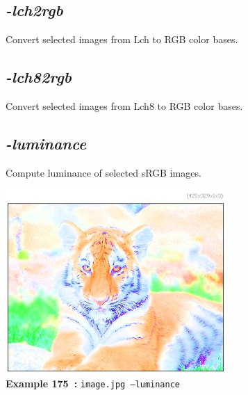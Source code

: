 \documentclass[a4paper,11pt,twoside]{book}
\begin{document}
\subsection{\emph{-lch2rgb} }\vspace*{-0.5em}
Convert selected images from Lch to RGB color bases.


\subsection{\emph{-lch82rgb} }\vspace*{-0.5em}
Convert selected images from Lch8 to RGB color bases.


\subsection{\emph{-luminance} }\vspace*{-0.5em}
Compute luminance of selected sRGB images.
\begin{center}\includegraphics[keepaspectratio=true,height=7cm,width=\textwidth]{img/gmic_def175.jpg}\\
{\footnotesize \textbf{Example 175~:} \texttt{image.jpg --luminance}}
\end{center}
\end{document}

